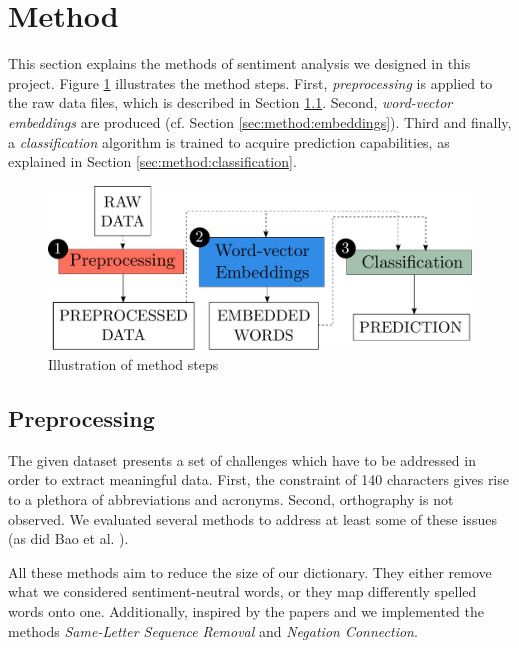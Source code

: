 \section{Method}\label{sec:method}

This section explains the methods of sentiment analysis we designed in this project. Figure \ref{fig:method-steps} illustrates the method steps. First, \textit{preprocessing} is applied to the raw data files, which is described in Section \ref{sec:method:preprocessing}. Second, \textit{word-vector embeddings} are produced (cf. Section \ref{sec:method:embeddings}). Third and finally, a \textit{classification} algorithm is trained to acquire prediction capabilities, as explained in Section \ref{sec:method:classification}.

\begin{figure} 	
	\centering 	
	\includegraphics[width=\columnwidth]{graphics/method-steps.pdf} 	
	\caption{Illustration of method steps} 	
	\label{fig:method-steps} 
\end{figure}

\subsection{Preprocessing}\label{sec:method:preprocessing}
The given dataset presents a set of challenges which have to be addressed in order to extract meaningful data. First, the constraint of 140 characters gives rise to a plethora of abbreviations and acronyms. Second, orthography is not observed. We evaluated several methods to address at least some of these issues (as did Bao et al. \cite{bao2014role}).

All these methods aim to reduce the size of our dictionary. They either remove what we considered sentiment-neutral words, or they map differently spelled words onto one. Additionally, inspired by the papers \cite{hemalatha2012preprocessing} and \cite{bao2014role} we implemented the methods \textit{Same-Letter Sequence Removal} and \textit{Negation Connection}.

